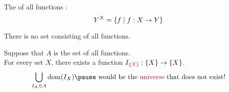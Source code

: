 %
%

\begin{frame}{}
  \begin{definition}[$Y^{X}$]
    The  of all functions :
    \[
      Y^{X} = \{f \mid f: X \to Y\}
    \]
  \end{definition}

  \pause
  \begin{center}
  \end{center}

  \pause
  \begin{theorem}
    There is no set consisting of all functions.
  \end{theorem}

  \pause
  \begin{center}
    Suppose  that $A$ is the set of all functions. \\[8pt]

    \pause
    For every set $X$, there exists a function $I_{\textcolor{red}{\{X\}}}: \{X\} \to \{X\}$.
    \pause
    \[
      \bigcup_{I_{X} \in A} \dom(I_{X})
        \pause\text{ would be the \purple{universe} that does not exist!}
    \]
  \end{center}
\end{frame}
